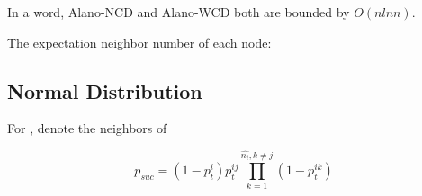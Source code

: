 In a word, Alano-NCD and Alano-WCD both are bounded by $O(nlnn)$.







The expectation neighbor number of each node:





\subsection{Normal Distribution}
\label{normal}

For , denote the neighbors of 

$$
p_{suc} = (1-p_t^i)p_t^{ij}\prod_{ k=1}^{\hat{n_i}, k\neq j}(1-p_t^{ik})
$$





